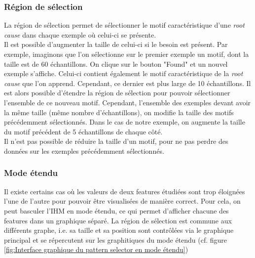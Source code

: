 \subsubsection{Région de sélection}
\label{Industrialisation du produit: Outils graphiques: Pattern selection: La région de sélection}
La région de sélection permet de sélectionner le motif caractéristique d'une \emph{root cause} dans chaque exemple où celui-ci se présente. \\
 Il est possible d'augmenter la taille de celui-ci si le besoin est présent. Par exemple, imaginons que l'on sélectionne sur le premier exemple un motif, dont la taille est de 60 échantillons. On clique sur le bouton "Found" et un nouvel exemple s'affiche. Celui-ci contient également le motif caractéristique de la \emph{root cause} que l'on apprend. Cependant, ce dernier est plus large de 10 échantillons. Il est alors possible d'étendre la région de sélection pour pouvoir sélectionner l'ensemble de ce nouveau motif. Cependant, l'ensemble des exemples devant avoir la même taille (même nombre d'échantillons), on modifie la taille des motifs précédemment sélectionnés. Dans le cas de notre exemple, on augmente la taille du motif précédent de 5 échantillons de chaque côté. \\
Il n'est pas possible de réduire la taille d'un motif, pour ne pas perdre des données sur les exemples précédemment sélectionnés. 

\subsubsection{Mode étendu}
\label{Industrialisation du produit: Outils graphiques: Pattern selection: Mode étendu}
Il existe certains cas où les valeurs de deux features étudiées sont trop éloignées l'une de l'autre pour pouvoir être visualisées de manière correct. Pour cela, on peut basculer l'IHM en mode étendu, ce qui permet d'afficher chacune des features dans un graphique séparé. La région de sélection est commune aux différents graphe, i.e. sa taille et sa position sont contrôlées via le graphique principal et se répercutent sur les graphitiques du mode étendu (cf. figure \ref{fig:Interface graphique du pattern selector en mode étendu})

